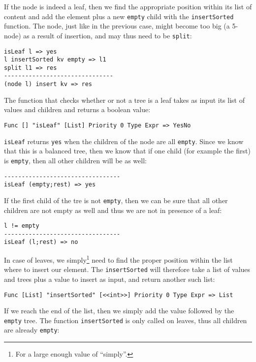 If the node is indeed a leaf, then we find the appropriate position within its list of content and add the element plus a new \texttt{empty} child with the \texttt{insertSorted} function. The node, just like in the previous case, might become too big (a 5-node) as a result of insertion, and may thus need to be \texttt{split}:

\begin{lstlisting}
isLeaf l => yes
l insertSorted kv empty => l1
split l1 => res
-------------------------------
(node l) insert kv => res
\end{lstlisting}

The function that checks whether or not a tree is a leaf takes as input its list of values and children and returns a boolean value:

\begin{lstlisting}
Func [] "isLeaf" [List] Priority 0 Type Expr => YesNo
\end{lstlisting}

\texttt{isLeaf} returns \texttt{yes} when the children of the node are all \texttt{empty}. Since we know that this is a balanced tree, then we know that if one child (for example the first) is \texttt{empty}, then all other children will be as well:

\begin{lstlisting}
---------------------------------
isLeaf (empty;rest) => yes
\end{lstlisting}

If the first child of the tre is not \texttt{empty}, then we can be sure that all other children are not empty as well and thus we are not in presence of a leaf:

\begin{lstlisting}
l != empty
---------------------------------
isLeaf (l;rest) => no
\end{lstlisting}

In case of leaves, we simply\footnote{For a large enough value of ``simply''.} need to find the proper position within the list where to insert our element. The \texttt{insertSorted} will therefore take a list of values and trees plus a value to insert as input, and return another such list:

\begin{lstlisting}
Func [List] "insertSorted" [<<int>>] Priority 0 Type Expr => List
\end{lstlisting}

If we reach the end of the list, then we simply add the value followed by the \texttt{empty} tree. The function \texttt{insertSorted} is only called on leaves, thus all children are already \texttt{empty}:

